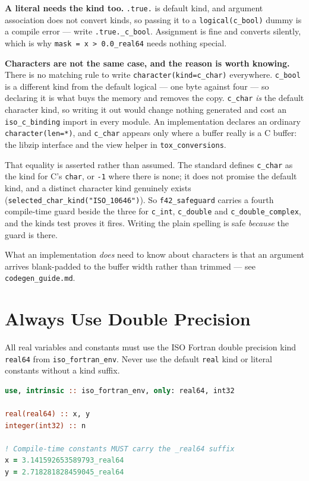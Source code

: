 \documentclass{article}
\begin{document}
\textbf{A literal needs the kind too.} \texttt{.true.} is default kind, and argument
association does not convert kinds, so passing it to a \texttt{logical(c\_bool)} dummy is a
compile error --- write \texttt{.true.\_c\_bool}. Assignment is fine and converts silently,
which is why \texttt{mask = x > 0.0\_real64} needs nothing special.

\textbf{Characters are not the same case, and the reason is worth knowing.} There is no
matching rule to write \texttt{character(kind=c\_char)} everywhere. \texttt{c\_bool} is a
different kind from the default logical --- one byte against four --- so declaring it is what
buys the memory and removes the copy. \texttt{c\_char} \emph{is} the default character kind, so
writing it out would change nothing generated and cost an \texttt{iso\_c\_binding} import in
every module. An implementation declares an ordinary \texttt{character(len=*)}, and
\texttt{c\_char} appears only where a buffer really is a C buffer: the libzip interface and the
view helper in \texttt{tox\_conversions}.

That equality is asserted rather than assumed. The standard defines \texttt{c\_char} as the kind
for C's \texttt{char}, or \texttt{-1} where there is none; it does not promise the default kind,
and a distinct character kind genuinely exists (\texttt{selected\_char\_kind("ISO\_10646")}).
So \texttt{f42\_safeguard} carries a fourth compile-time guard beside the three for
\texttt{c\_int}, \texttt{c\_double} and \texttt{c\_double\_complex}, and the kinds test proves it
fires. Writing the plain spelling is safe \emph{because} the guard is there.

What an implementation \emph{does} need to know about characters is that an argument arrives
blank-padded to the buffer width rather than trimmed --- see \texttt{codegen\_guide.md}.

\section{Always Use Double Precision}

All real variables and constants must use the ISO Fortran double precision kind \texttt{real64} from \texttt{iso\_fortran\_env}. Never use the default \texttt{real} kind or literal constants without a kind suffix.

\begin{lstlisting}[language=Fortran]
use, intrinsic :: iso_fortran_env, only: real64, int32

real(real64) :: x, y
integer(int32) :: n

! Compile-time constants MUST carry the _real64 suffix
x = 3.141592653589793_real64
y = 2.718281828459045_real64
\end{lstlisting}
\end{document}
